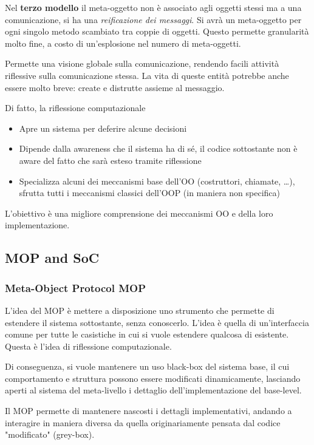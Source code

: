Nel \textbf{terzo modello} il meta-oggetto non è associato agli oggetti stessi ma a una comunicazione, si ha una \textit{reificazione dei messaggi}. Si avrà un meta-oggetto per ogni singolo metodo scambiato tra coppie di oggetti. Questo permette granularità molto fine, a costo di un'esplosione nel numero di meta-oggetti.

Permette una visione globale sulla comunicazione, rendendo facili attività riflessive sulla comunicazione stessa. La vita di queste entità potrebbe anche essere molto breve: create e distrutte assieme al messaggio.

Di fatto, la riflessione computazionale
\begin{itemize}
	\item Apre un sistema per deferire alcune decisioni
	
	\item Dipende dalla awareness che il sistema ha di sé, il codice sottostante non è aware del fatto che sarà esteso tramite riflessione
	
	\item Specializza alcuni dei meccanismi base dell'OO (costruttori, chiamate, \dots), sfrutta tutti i meccanismi classici dell'OOP (in maniera non specifica)
\end{itemize}
L'obiettivo è una migliore comprensione dei meccanismi OO e della loro implementazione.


\subsection{MOP and SoC}

\subsubsection{Meta-Object Protocol MOP}

L'idea del MOP è mettere a disposizione uno strumento che permette di estendere il sistema sottostante, senza conoscerlo. L'idea è quella di un'interfaccia comune per tutte le casistiche in cui si vuole estendere qualcosa di esistente. Questa è l'idea di riflessione computazionale.

Di conseguenza, si vuole mantenere un uso black-box del sistema base, il cui comportamento e struttura possono essere modificati dinamicamente, lasciando aperti al sistema del meta-livello i dettaglio dell'implementazione del base-level.

Il MOP permette di mantenere nascosti i dettagli implementativi, andando a interagire in maniera diversa da quella originariamente pensata dal codice "modificato" (grey-box).


